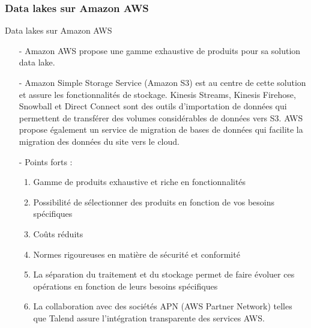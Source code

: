 \subsubsection{Data lakes sur Amazon AWS}
\begin{frame}{Data lakes sur Amazon AWS}
    \begin{itemize}\itemsep1em
        \item[-] Amazon AWS propose une gamme exhaustive de produits pour sa solution data lake.
        \item[-] Amazon Simple Storage Service (Amazon S3) est au centre de cette solution et assure les fonctionnalités de stockage. Kinesis Streams, Kinesis Firehose, Snowball et Direct Connect sont des outils d'importation de données qui permettent de transférer des volumes considérables de données vers S3. AWS propose également un service de migration de bases de données qui facilite la migration des données du site vers le cloud.

        \item[-] Points forts :
        \begin{enumerate}
            \item Gamme de produits exhaustive et riche en fonctionnalités
            \item Possibilité de sélectionner des produits en fonction de vos besoins spécifiques
            \item Coûts réduits
            \item Normes rigoureuses en matière de sécurité et conformité
            \item La séparation du traitement et du stockage permet de faire évoluer ces opérations en fonction de leurs besoins spécifiques
            \item La collaboration avec des sociétés APN (AWS Partner Network) telles que Talend assure l'intégration transparente des services AWS.
        \end{enumerate}
    \end{itemize}
\end{frame}

